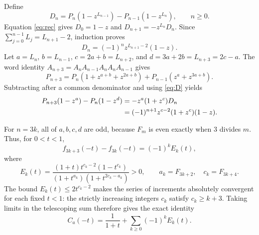 \documentclass[11pt]{article}
\begin{document}
Define
\[
 D_n=P_n(1-z^{L_{n-1}})-P_{n-1}(1-z^{L_n}),\qquad n\geq0.
\]
Equation \eqref{eq:rec} gives $D_0=1-z$ and
$D_{n+1}=-z^{L_n}D_n$. Since
$\sum_{j=0}^{n-1}L_j=L_{n+1}-2$, induction proves
\begin{equation}\label{eq:D}
 D_n=(-1)^nz^{L_{n+1}-2}(1-z).
\end{equation}
Let $a=L_n$, $b=L_{n-1}$, $c=2a+b=L_{n+2}$, and
$d=3a+2b=L_{n+3}=2c-a$. The word identity
$A_{n+3}=A_nA_{n-1}A_nA_nA_{n-1}$ gives
\[
 P_{n+3}=P_n(1+z^{a+b}+z^{2a+b})
             +P_{n-1}(z^a+z^{3a+b}).
\]
Subtracting after a common denominator and using \eqref{eq:D} yields
\begin{align}
 P_{n+3}(1-z^a)-P_n(1-z^d)
 &=-z^a(1+z^c)D_n \notag\\
 &=(-1)^{n+1}z^{c-2}(1+z^c)(1-z).
 \label{eq:triple}
\end{align}

For $n=3k$, all of $a,b,c,d$ are odd, because $F_m$ is even
exactly when $3$ divides $m$. Thus, for $0<t<1$,
\[
 f_{3k+3}(-t)-f_{3k}(-t)=(-1)^k E_k(t),
\]
where
\begin{equation}\label{eq:E}
 E_k(t)=
 \frac{(1+t)t^{c_k-2}(1-t^{c_k})}
 {(1+t^{a_k})(1+t^{2c_k-a_k})}>0,\qquad
 a_k=F_{3k+2},\quad c_k=F_{3k+4}.
\end{equation}
The bound $E_k(t)\leq2t^{c_k-2}$ makes the series of increments
absolutely convergent for each fixed $t<1$: the strictly increasing
integers $c_k$ satisfy $c_k\geq k+3$. Taking limits in the telescoping
sum therefore gives the exact identity
\begin{equation}\label{eq:series}
 C_a(-t)=\frac{1}{1+t}+\sum_{k\geq0}(-1)^kE_k(t).
\end{equation}
\end{document}
